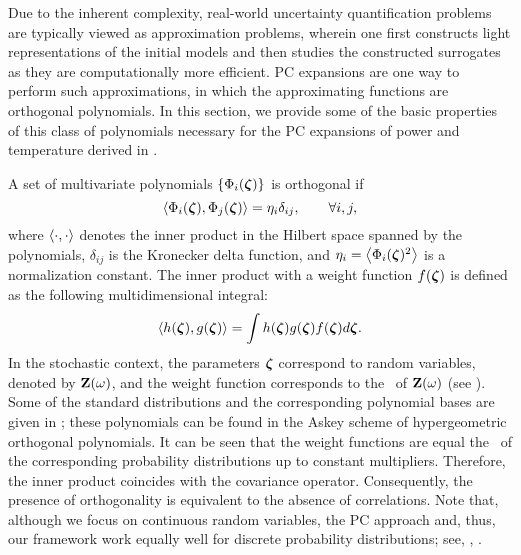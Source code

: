 Due to the inherent complexity, real-world uncertainty quantification problems are typically viewed as approximation problems, wherein one first constructs light representations of the initial models and then studies the constructed surrogates as they are computationally more efficient.
PC expansions \cite{xiu2010} are one way to perform such approximations, in which the approximating functions are orthogonal polynomials.
In this section, we provide some of the basic properties \cite{xiu2010, maitre2010} of this class of polynomials necessary for the PC expansions of power and temperature derived in .

A set of multivariate polynomials $\{ \Phi_i(\boldsymbol{\zeta}) \}$ is orthogonal if
\begin{equation} \elabel{orthogonality}
  \oInner{\pcb_i(\vz)}{\pcb_j(\vz)} = \pcn_i \delta_{ij}, \qquad \forall i, j,
\end{equation}
where $\oInner{\idot}{\idot}$ denotes the inner product in the Hilbert space spanned by the polynomials, $\delta_{ij}$ is the Kronecker delta function, and $\pcn_i = \oInner{\pcb_i(\vz)^2}$ is a normalization constant.
The inner product with a weight function $f(\boldsymbol{\zeta})$ is defined as the following multidimensional integral:
\begin{equation} \elabel{inner-product}
  \oInner{h(\vz)}{g(\vz)} = \int h(\vz) g(\vz) \PDF(\vz) d\vz.
\end{equation}
In the stochastic context, the parameters $\boldsymbol{\zeta}$ correspond to random variables, denoted by $\mathbf{Z}(\omega)$, and the weight function corresponds to the \pdf\ of $\mathbf{Z}(\omega)$ (see ).
Some of the standard distributions and the corresponding polynomial bases are given in  \cite{eldred2008}; these polynomials can be found in the Askey scheme \cite{xiu2010} of hypergeometric orthogonal polynomials.
It can be seen that the weight functions are equal the \pdfs\ of the corresponding probability distributions up to constant multipliers.
Therefore, the inner product coincides with the covariance operator.
Consequently, the presence of orthogonality is equivalent to the absence of correlations.
Note that, although we focus on continuous random variables, the PC approach and, thus, our framework work equally well for discrete probability distributions; see, \eg, \cite{xiu2010, maitre2010}.
